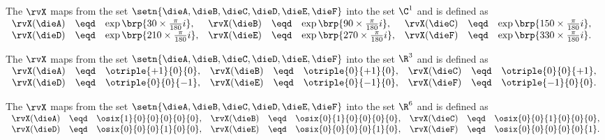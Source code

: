 \begin{definition}
\label{def:rv_dieqpsk}
The  $\rvX$ maps from the set $\setn{\dieA,\dieB,\dieC,\dieD,\dieE,\dieF}$ into the set $\C^1$
and is defined as\footnotemark 
\\\indentx$\begin{array}{rclrclrcl}
    \rvX(\dieA) &\eqd& \exp\brp{ 30\times\frac{\pi}{180}i}, 
   &\rvX(\dieB) &\eqd& \exp\brp{ 90\times\frac{\pi}{180}i}, 
   &\rvX(\dieC) &\eqd& \exp\brp{150\times\frac{\pi}{180}i}, 
  \\\rvX(\dieD) &\eqd& \exp\brp{210\times\frac{\pi}{180}i}, 
   &\rvX(\dieE) &\eqd& \exp\brp{270\times\frac{\pi}{180}i},
   &\rvX(\dieF) &\eqd& \exp\brp{330\times\frac{\pi}{180}i}.
\end{array}$
\end{definition}

\begin{definition}
\label{def:rv_dieR3}
The  $\rvX$ maps from the set $\setn{\dieA,\dieB,\dieC,\dieD,\dieE,\dieF}$ into the set $\R^3$
and is defined as 
\\\indentx$\begin{array}{rclrclrcl}
    \rvX(\dieA) &\eqd& \otriple{+1}{ 0}{ 0}, 
   &\rvX(\dieB) &\eqd& \otriple{ 0}{+1}{ 0}, 
   &\rvX(\dieC) &\eqd& \otriple{ 0}{ 0}{+1}, 
  \\\rvX(\dieD) &\eqd& \otriple{ 0}{ 0}{-1}, 
   &\rvX(\dieE) &\eqd& \otriple{ 0}{-1}{ 0},
   &\rvX(\dieF) &\eqd& \otriple{-1}{ 0}{ 0}.
\end{array}$
\end{definition}

\begin{definition}
\label{def:rv_dieR6}
The  $\rvX$ maps from the set $\setn{\dieA,\dieB,\dieC,\dieD,\dieE,\dieF}$ into the set $\R^6$
and is defined as 
\\\indentx$\begin{array}{rclrclrcl}
    \rvX(\dieA) &\eqd& \osix{1}{0}{0}{0}{0}{0}, 
   &\rvX(\dieB) &\eqd& \osix{0}{1}{0}{0}{0}{0}, 
   &\rvX(\dieC) &\eqd& \osix{0}{0}{1}{0}{0}{0}, 
  \\\rvX(\dieD) &\eqd& \osix{0}{0}{0}{1}{0}{0}, 
   &\rvX(\dieE) &\eqd& \osix{0}{0}{0}{0}{1}{0},
   &\rvX(\dieF) &\eqd& \osix{0}{0}{0}{0}{0}{1}.
\end{array}$
\end{definition}

